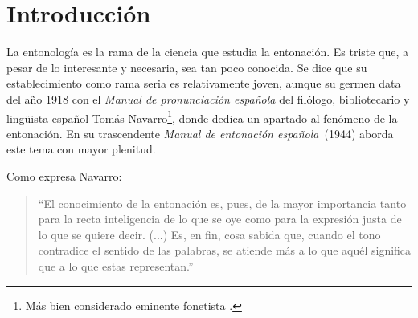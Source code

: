 \chapter*{Introducción}\label{chapter:introduction}

\begin{comment}
janet 1980
cantero 1995

el pudor de desnudarse de los habitos de la lengua propia para acomodarse a los de una lengua extranjera tiene en la entonacion su mas fuerte reducto navarro


Importancia de la entonologia
- sintesis de voz (porque hacer falta anotar bastantes curvas para entrenar una inteligencia rtificial que hable como un cubano x ejemplo)


\cite[dificil de anotar a mano, transcripcion automatica]{silverman1992tobi}

\end{comment}


La entonolog\'ia es la rama de la ciencia que estudia la entonaci\'on. Es triste que, a pesar de lo interesante y necesaria, sea tan poco conocida. Se dice que su establecimiento como rama seria es relativamente joven, aunque su germen data del a\~no 1918 con el \emph{Manual de pronunciaci\'on espa\~nola} \cite{navarro1918manual} del fil\'ologo, bibliotecario y ling\"uista espa\~nol Tom\'as Navarro\footnote{M\'as bien considerado eminente fonetista \cite{garcia1996aspectos1}.}, donde dedica un apartado al fen\'omeno de la entonaci\'on. En su trascendente \emph{Manual de entonaci\'on espa\~nola}~(1944) \cite{tomas1974manual} aborda este tema con mayor plenitud.

Como expresa Navarro:

\begin{quote}
``El conocimiento de la entonaci\'on es, pues, de la mayor importancia tanto para la recta inteligencia de lo que se oye como para la expresi\'on justa de lo que se quiere decir. (...) Es, en fin, cosa sabida que, cuando el tono contradice el sentido de las palabras, se atiende m\'as a lo que aqu\'el significa que a lo que estas representan.''
\end{quote}



